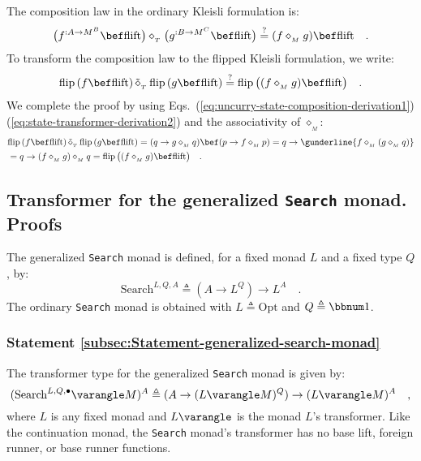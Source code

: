 The composition law in the ordinary Kleisli formulation is:
\[
\big(f^{:A\rightarrow M^{B}}\bef\text{flift}\big)\diamond_{_{T}}\big(g^{:B\rightarrow M^{C}}\bef\text{flift}\big)\overset{?}{=}(f\diamond_{_{M}}g)\bef\text{flift}\quad.
\]
To transform the composition law to the flipped Kleisli formulation,
we write:
\[
\text{flip}\,(f\bef\text{flift})\,\tilde{\diamond}_{_{T}}\,\text{flip}\,(g\bef\text{flift})\overset{?}{=}\text{flip}\,\big((f\diamond_{_{M}}g)\bef\text{flift}\big)\quad.
\]
We complete the proof by using Eqs.~(\ref{eq:uncurry-state-composition-derivation1})\textendash (\ref{eq:state-transformer-derivation2})
and the associativity of $\diamond_{_{M}}$:
\begin{align*}
 & \text{flip}\,(f\bef\text{flift})\,\tilde{\diamond}_{_{T}}\,\text{flip}\,(g\bef\text{flift})=(q\rightarrow g\diamond_{_{M}}q)\bef(p\rightarrow f\diamond_{_{M}}p)=q\rightarrow\gunderline{f\diamond_{_{M}}(g\diamond_{_{M}}q)}\\
 & =q\rightarrow(f\diamond_{_{M}}g)\diamond_{_{M}}q=\text{flip}\,\big((f\diamond_{_{M}}g)\bef\text{flift}\big)\quad.
\end{align*}


\subsection{Transformer for the generalized \texttt{Search} monad. Proofs\label{subsec:Transformer-for-the-generalized-search-monad}}

The generalized
\lstinline!Search! monad is defined, for a fixed monad $L$ and a
fixed type $Q$, by:
\[
\text{Search}^{L,Q,A}\triangleq(A\rightarrow L^{Q})\rightarrow L^{A}\quad.
\]
The ordinary \lstinline!Search! monad is obtained with $L\triangleq\text{Opt}$
and $Q\triangleq\bbnum 1$.

\subsubsection{Statement \label{subsec:Statement-generalized-search-monad}\ref{subsec:Statement-generalized-search-monad}}

The transformer type for the generalized \lstinline!Search! monad
is given by:
\[
(\text{Search}^{L,Q,\bullet}\varangle M)^{A}\triangleq(A\rightarrow(L\varangle M)^{Q})\rightarrow(L\varangle M)^{A}\quad,
\]
where $L$ is any fixed monad and $L\varangle$ is the monad $L$\textsf{'}s
transformer. Like the continuation monad, the \lstinline!Search!
monad\textsf{'}s transformer has no base lift, foreign runner, or base runner
functions.

